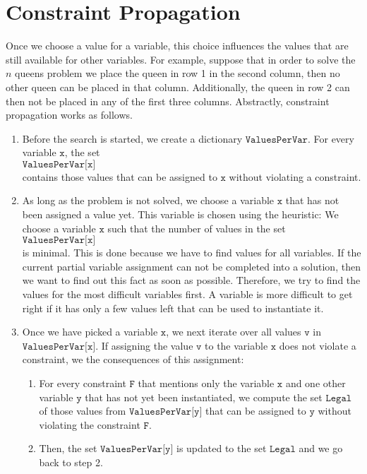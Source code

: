 \section{Constraint Propagation}
Once we choose a value for a variable, this choice influences the values that are still available for other variables.
For example, suppose that in order to solve the $n$ queens problem we place the queen in row 1 in the second
column, then no other queen can be placed in 
that column.   Additionally, the queen in row 2 can then not be placed in any of the first three columns.
Abstractly, constraint propagation works as follows.
\begin{enumerate}
\item Before the search is started, we create a dictionary $\texttt{ValuesPerVar}$.  For every variable
      $\texttt{x}$,  the set
      \\[0.2cm]
      \hspace*{1.3cm}
      $\texttt{ValuesPerVar[x]}$ 
      \\[0.2cm]
      contains those values that can be assigned to
      $\texttt{x}$ without violating a constraint. 
\item As long as the problem is not solved,  we choose a variable $\texttt{x}$ that has not been assigned a
      value yet.  This variable is chosen using the  heuristic:  We choose a
      variable $\texttt{x}$ such that the number of values in the set
      \\[0.2cm]
      \hspace*{1.3cm}
      $\texttt{ValuesPerVar[x]}$ 
      \\[0.2cm]
      is minimal.  This is done because we have to
      find values for all variables.  If the current partial variable assignment can not be completed into a
      solution, then we want to find out this fact as soon as possible.  Therefore, we try to find the values
      for the most difficult variables first.  A variable is more difficult to get right if it has only a few
      values left that can be used to instantiate it.
\item Once we have picked a variable $\texttt{x}$, we next iterate over all values $\texttt{v}$ in
      $\texttt{ValuesPerVar[x]}$.  If assigning the value $\texttt{v}$ to the variable $\texttt{x}$ does not
      violate a constraint, we  the consequences of this assignment:
      \begin{enumerate}
      \item For every constraint $\texttt{F}$ that mentions only the variable $\texttt{x}$ and one other variable
            $\texttt{y}$ that has not yet been instantiated, we compute the set $\texttt{Legal}$ of those values from 
            $\texttt{ValuesPerVar[y]}$ that can be assigned to $\texttt{y}$ without violating the constraint
            $\texttt{F}$.
            
      \item Then, the set $\texttt{ValuesPerVar[y]}$ is updated to the set $\texttt{Legal}$ and we go back to
            step 2.
      \end{enumerate}
\end{enumerate}
